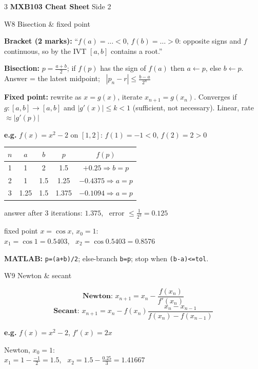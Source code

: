 \documentclass[8pt,a4paper]{extarticle}
\newcommand{\hd}[1]{\par\vspace{3pt}\noindent\colorbox{accent}{\parbox{\dimexpr\linewidth-2\fboxsep}{\color{white}\bfseries\strut #1}}\par\vspace{1pt}}
\newcommand{\sub}[1]{\textbf{\color{accent}#1}}
\newenvironment{ex}[1]{\par\vspace{2pt}\noindent\begin{lrbox}{\exbox}\begin{minipage}{\dimexpr\linewidth-2\fboxsep}\RaggedRight\color{grn}\textbf{e.g.} #1\par\setlength{\parskip}{1.5pt}}{\end{minipage}\end{lrbox}\colorbox{exbg}{\usebox{\exbox}}\par\vspace{1pt}}
\begin{document}
\newpage
\begin{multicols*}{3}
{\color{accent}\large\bfseries MXB103 Cheat Sheet} {\color{muted}\scriptsize Side 2}\par

\hd{W8 Bisection \& fixed point}
\sub{Bracket (2 marks):} ``$f(a)=\dots<0$, $f(b)=\dots>0$: opposite signs and $f$ continuous, so by the IVT $[a,b]$ contains a root.''
\begin{tl}
\item \sub{Bisection:} $p=\frac{a+b}{2}$; if $f(p)$ has the sign of $f(a)$ then $a\leftarrow p$, else $b\leftarrow p$. Answer = the latest midpoint; \ $|p_n-r|\le\frac{b-a}{2^n}$
\item \sub{Fixed point:} rewrite as $x=g(x)$, iterate $x_{n+1}=g(x_n)$. Converges if $g:[a,b]\to[a,b]$ and $|g'(x)|\le k<1$ (sufficient, not necessary). Linear, rate $\approx|g'(p)|$
\end{tl}
\begin{ex}{$f(x)=x^2-2$ on $[1,2]$: $f(1)=-1<0$, $f(2)=2>0$}
{\centering\begin{tabular}{@{}c|c|c|c|c@{}}
$n$ & $a$ & $b$ & $p$ & $f(p)$\\\hline
1 & 1 & 2 & 1.5 & $+0.25\Rightarrow b=p$\\
2 & 1 & 1.5 & 1.25 & $-0.4375\Rightarrow a=p$\\
3 & 1.25 & 1.5 & 1.375 & $-0.1094\Rightarrow a=p$
\end{tabular}\par}
answer after 3 iterations: $1.375$, \ error $\le\frac{1}{2^3}=0.125$

fixed point $x=\cos x$, $x_0=1$:\\
$x_1=\cos1=0.5403$, \ $x_2=\cos0.5403=0.8576$
\end{ex}
\sub{MATLAB:} \texttt{p=(a+b)/2}; else-branch \texttt{b=p}; stop when \texttt{(b-a)<=tol}.

\hd{W9 Newton \& secant}
\[\textbf{Newton: }x_{n+1}=x_n-\frac{f(x_n)}{f'(x_n)}\]
\[\textbf{Secant: }x_{n+1}=x_n-f(x_n)\frac{x_n-x_{n-1}}{f(x_n)-f(x_{n-1})}\]
\begin{ex}{$f(x)=x^2-2$, $f'(x)=2x$}
Newton, $x_0=1$:\\
$x_1=1-\frac{-1}{2}=1.5$, \ $x_2=1.5-\frac{0.25}{3}=1.41667$


\end{ex}
\end{multicols*}
\end{document}
